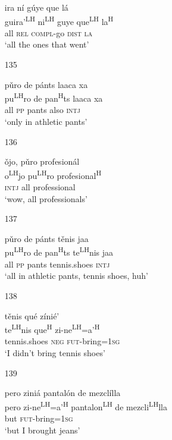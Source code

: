 \begin{itemize}
\glll   ira n\'{i} g\'{u}ye que l\'{a}\\
  guira'\textsuperscript{LH} ni\textsuperscript{LH} guye que\textsuperscript{LH} la\textsuperscript{H} \\
all \textsc{rel} \textsc{compl}-go \textsc{dist} \textsc{la}\\
\glt `all the ones that went'



\item[135]
 
\glll   p\v{u}ro de p\'{a}nts laaca xa \\ 
 pu\textsuperscript{LH}ro de pan\textsuperscript{H}ts laaca xa\\
all \textsc{pp} pants also \textsc{intj}\\
\glt `only in athletic pants'




\item[136]
 
\glll   \v{o}jo, p\v{u}ro profesion\'{a}l\\
 o\textsuperscript{LH}jo pu\textsuperscript{LH}ro profesional\textsuperscript{H} \\
\textsc{intj} all professional\\
\glt `wow, all professionals'




\item[137]
 
\glll   p\v{u}ro de p\'{a}nts t\v{e}nis jaa\\
 pu\textsuperscript{LH}ro de pan\textsuperscript{H}ts te\textsuperscript{LH}nis jaa\\
  all \textsc{pp} pants tennis.shoes \textsc{intj}\\
\glt `all in athletic pants, tennis shoes, huh'
 


\item[138]
 
\glll   t\v{e}nis qu\'{e} z\'{i}ni\'{e}' \\
 te\textsuperscript{LH}nis  que\textsuperscript{H} zi-ne\textsuperscript{LH}=a'\textsuperscript{H} \\
tennis.shoes \textsc{neg} \textsc{fut}-bring=\textsc{1sg}\\
\glt `I didn't bring tennis shoes'
 


\item[139]
 
\glll  pero zini\'{a} pantal\'{o}n de mezcl\'{i}lla\\
pero zi-ne\textsuperscript{LH}=a'\textsuperscript{H} pantalon\textsuperscript{LH} de mezcli\textsuperscript{LH}lla\\
but \textsc{fut}-bring=\textsc{1sg}\\
\glt `but I brought jeans'
 



\end{itemize}
